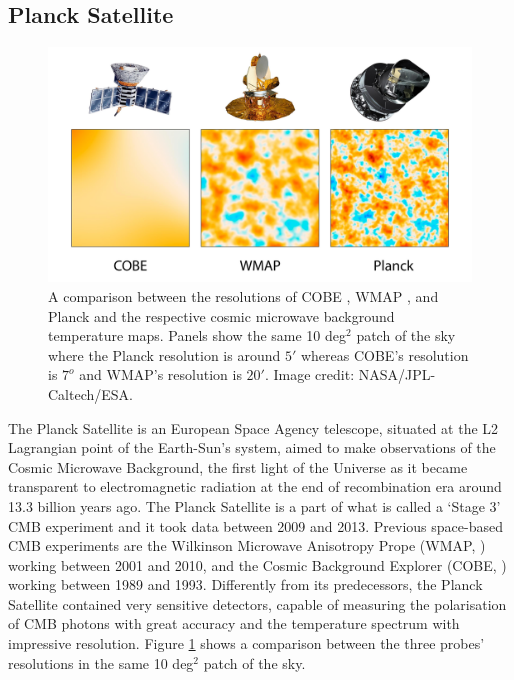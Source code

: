 \subsection{Planck Satellite}
\begin{figure}
\begin{center}
\includegraphics[width=\textwidth]{Intro-FIGS/planck_wmap_cobe.jpg}
\caption[A comparison between three generations of space CMB experiments. Image credit: NASA/JPL-Caltech/ESA.]{A comparison between the resolutions of COBE \citep{COBE}, WMAP \citep{WMAP_MapsResults}, and Planck \citep{planck2013} and the respective cosmic microwave background temperature maps. Panels show the same 10 deg$^2$ patch of the sky where the Planck resolution is around $5'$ whereas COBE's resolution is $7^o$ and WMAP's resolution is $20'$. Image credit: NASA/JPL-Caltech/ESA.}
\label{fig:PlanckWMAPCOBE}
\end{center}
\end{figure}
The Planck Satellite \citep{planck2013} is an European Space Agency telescope, situated at the L2 Lagrangian point of the Earth-Sun's system, aimed to make observations of the Cosmic Microwave Background, the first light of the Universe as it became transparent to electromagnetic radiation at the end of recombination era around 13.3 billion years ago. The Planck Satellite is a part of what is called a `Stage 3' CMB experiment and it took data between 2009 and 2013. Previous space-based CMB experiments are the Wilkinson Microwave Anisotropy Prope (WMAP, \citealt{WMAP_MapsResults}) working between 2001 and 2010, and the Cosmic Background Explorer (COBE, \citealt{COBE}) working between 1989 and 1993. Differently from its predecessors, the Planck Satellite contained very sensitive detectors, capable of measuring the polarisation of CMB photons with great accuracy and the temperature spectrum with impressive resolution. Figure \ref{fig:PlanckWMAPCOBE} shows a comparison between the three probes' resolutions in the same 10 deg$^2$ patch of the sky.


